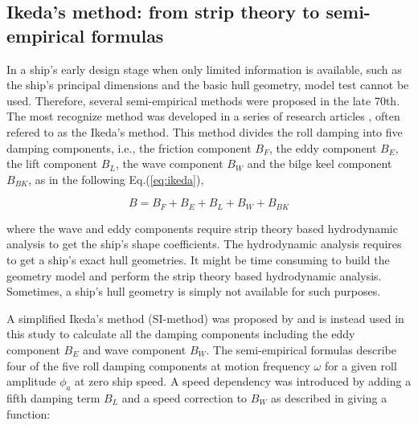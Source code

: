 
\subsection{Ikeda's method: from strip theory to semi-empirical formulas}
\label{se:semi-empirical methods}
In a ship's early design stage when only limited information is available, such as the ship's principal dimensions and the basic hull geometry, model test cannot be used. Therefore, several semi-empirical methods were proposed in the late 70th. The most recognize method was developed in a series of research articles \parencite{ikeda_roll_1978,ikeda_eddy_1978,ikeda_roll_1979,ikeda_components_1978,ikeda_velocity_1979}, often refered to as the Ikeda's method. This method divides the roll damping into five damping components, i.e., the friction component $B_F$, the eddy component $B_E$, the lift component $B_L$, the wave component $B_W$ and the bilge keel component $B_{BK}$, as in the following Eq.(\ref{eq:ikeda}), 

\begin{equation} \label{eq:ikeda}
B = B_F + B_E + B_L + B_W + B_{BK}
\end{equation}

where the wave and eddy components require strip theory based hydrodynamic analysis to get the ship's shape coefficients. The hydrodynamic analysis requires to get a ship's exact hull geometries. It might be time consuming to build the geometry model and perform the strip theory based hydrodynamic analysis. Sometimes, a ship's hull geometry is simply not available for such purposes. 

A simplified Ikeda's method (SI-method) was proposed by \parencite{kawahara_simple_2011} and is instead used in this study to calculate all the damping components including the eddy component $B_E$ and wave component $B_W$. The semi-empirical formulas describe four of the five roll damping components at motion frequency $\omega$ for a given roll amplitude $\phi_a$ at zero ship speed. A speed dependency was introduced by adding a fifth damping term $B_L$ and a speed correction to $B_W$ as described in \parencite{ikeda_velocity_1979} giving a function: 



